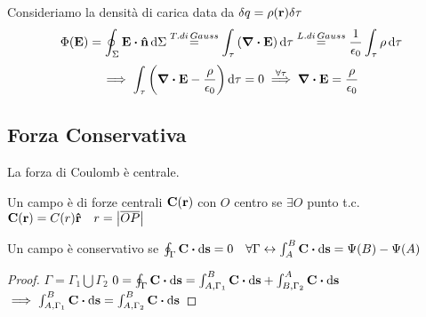 \documentclass[12pt,a4paper]{article}
\begin{document}
Consideriamo la densità di carica data da $\delta q = \rho(\vb{r})\delta\tau$
\begin{equation*}
    \Phi(\vb{E})= \oint_\Sigma \vb{E}\vdot\vu{n} \dd{\Sigma}  \overset{T. di\, Gauss}{=} \int_\tau\left( \div \vb{E} \right) \dd{\tau}
    \overset{L. di\, Gauss}{=}\frac{1}{\epsilon_0}\int_\tau\rho \dd{\tau}
\end{equation*}
\begin{equation*}
    \implies \int_\tau \left( \div \vb{E}-\frac{\rho}{\epsilon_0} \right) \dd{\tau} = 0 \overset{\forall \tau}{\implies } \div \vb{E} = \frac{\rho}{\epsilon_0}
\end{equation*}




\subsection{Forza Conservativa}
La forza di Coulomb è centrale.
\begin{definition}
    Un campo è di forze centrali $\vb{C}(\vb{r})$ con $O$ centro se $\exists O $ punto t.c. \\$\vb{C}(\vb{r})= C(r)\vu{r}\quad r = \abs{\overline{OP}}$
\end{definition}

\begin{definition}
    Un campo è conservativo se $\oint_\Gamma \vb{C}\vdot \dd{\vb{s}}= 0 \quad\forall\Gamma\leftrightarrow\int_{A}^{B}\vb{C}\vdot \dd{\vb{s}}= \Psi(B)-\Psi(A)$
\end{definition}
\begin{proof}
    $\Gamma= \Gamma_1\bigcup\Gamma_2$   \quad \quad         $0 = \oint_\Gamma \vb{C}\vdot \dd{\vb{s}}=\int_{A,\Gamma_1}^{B}\vb{C}\vdot \dd{\vb{s}}+\int_{B,\Gamma_2}^{A}\vb{C}\vdot \dd{\vb{s}}$
    \\$\implies \int_{A,\Gamma_1}^{B}\vb{C}\vdot \dd{\vb{s}}= \int_{A,\Gamma_2}^{B}\vb{C}\vdot \dd{\vb{s}}$
\end{proof}
\end{document}
